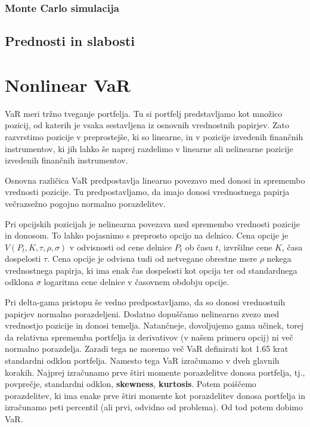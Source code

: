 \documentclass[a4paper, 12pt]{article}
\theoremstyle{definition}
\theoremstyle{plain}
\begin{document}
\subsubsection{Monte Carlo simulacija}

\subsection{Prednosti in slabosti}

\section{Nonlinear VaR}
VaR meri tržno tveganje portfelja. Tu si portfelj predstavljamo kot množico 
pozicij, od katerih je vsaka sestavljena iz osnovnih vrednostnih papirjev. Zato razvrstimo pozicije
v preprostejše, ki so linearne, in v pozicije izvedenih finančnih instrumentov, ki jih lahko še naprej
razdelimo v linearne ali nelinearne pozicije izvedenih finančnih instrumentov.


Osnovna različica VaR predpostavlja linearno povezavo med donosi in spremembo vrednosti pozicije.
Tu predpostavljamo, da imajo donosi vrednostnega papirja večrazsežno pogojno normalno porazdelitev.  

Pri opcijskih pozicijah je nelinearna povezava med spremembo vrednosti pozicije in donosom. 
To lahko pojasnimo s preprosto opcijo na delnico. Cena opcije je $V(P_t,K,\tau,\rho,\sigma)$ v 
odvisnosti od cene delnice $P_t$ ob času $t$, izvršilne cene $K$, časa dospelosti $\tau$. 
Cena opcije je odvisna tudi od netvegane obrestne mere $\rho$ nekega vrednostnega papirja, ki ima enak
čas dospelosti kot opcija ter od standardnega odklona $\sigma$ logaritma cene delnice v časovnem obdobju opcije.

Pri delta-gama pristopu še vedno predpostavljamo, da so donosi vrednostnih papirjev normalno porazdeljeni. 
Dodatno dopuščamo nelinearno zvezo med vrednostjo pozicije in donosi temelja. Natančneje, dovoljujemo gama učinek,
torej da relativna sprememba portfelja iz derivativov (v našem primeru opcij) ni več normalno porazdelja. 
Zaradi tega ne moremo več VaR definirati kot 1.65 krat standardni odklon portfelja. Namesto tega VaR 
izračunamo v dveh glavnih korakih. Najprej izračunamo prve štiri momente porazdelitve donosa portfelja, tj.,
povprečje, standardni odklon, \textbf{skewness}, \textbf{kurtosis}. Potem poiščemo 
porazdelitev, ki ima enake prve štiri momente kot porazdelitev donosa portfelja in izračunamo peti 
percentil (ali prvi, odvidno od problema). Od tod potem dobimo VaR.
\end{document}
